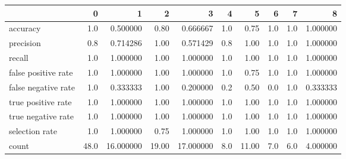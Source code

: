 \begin{tabular}{lrrrrrrrrr}
\toprule
{} &     0 &          1 &      2 &          3 &    4 &      5 &    6 &    7 &         8 \\
\midrule
accuracy            &   1.0 &   0.500000 &   0.80 &   0.666667 &  1.0 &   0.75 &  1.0 &  1.0 &  1.000000 \\
precision           &   0.8 &   0.714286 &   1.00 &   0.571429 &  0.8 &   1.00 &  1.0 &  1.0 &  1.000000 \\
recall              &   1.0 &   1.000000 &   1.00 &   1.000000 &  1.0 &   1.00 &  1.0 &  1.0 &  1.000000 \\
false positive rate &   1.0 &   1.000000 &   1.00 &   1.000000 &  1.0 &   0.75 &  1.0 &  1.0 &  1.000000 \\
false negative rate &   1.0 &   0.333333 &   1.00 &   0.200000 &  0.2 &   0.50 &  0.0 &  1.0 &  0.333333 \\
true positive rate  &   1.0 &   1.000000 &   1.00 &   1.000000 &  1.0 &   1.00 &  1.0 &  1.0 &  1.000000 \\
true negative rate  &   1.0 &   1.000000 &   1.00 &   1.000000 &  1.0 &   1.00 &  1.0 &  1.0 &  1.000000 \\
selection rate      &   1.0 &   1.000000 &   0.75 &   1.000000 &  1.0 &   1.00 &  1.0 &  1.0 &  1.000000 \\
count               &  48.0 &  16.000000 &  19.00 &  17.000000 &  8.0 &  11.00 &  7.0 &  6.0 &  4.000000 \\
\bottomrule
\end{tabular}

